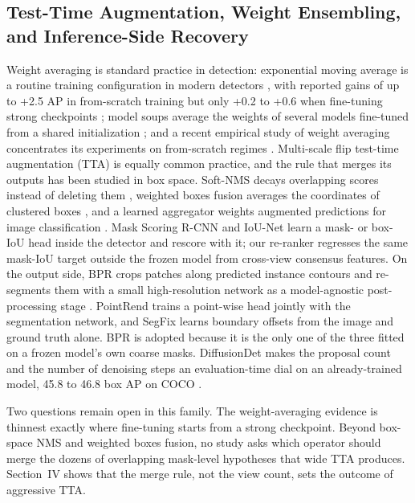 \subsection{Test-Time Augmentation, Weight Ensembling, and Inference-Side Recovery}
\label{sec:related-tta}
Weight averaging is standard practice in detection: exponential moving average is a routine training configuration in modern detectors \cite{rtdetrv22024}, with reported gains of up to +2.5 AP in from-scratch training but only +0.2 to +0.6 when fine-tuning strong checkpoints \cite{switchema2024}; model soups average the weights of several models fine-tuned from a shared initialization \cite{modelsoups2022}; and a recent empirical study of weight averaging concentrates its experiments on from-scratch regimes \cite{weightavg2025}. Multi-scale flip test-time augmentation (TTA) is equally common practice, and the rule that merges its outputs has been studied in box space. Soft-NMS decays overlapping scores instead of deleting them \cite{softnms2017}, weighted boxes fusion averages the coordinates of clustered boxes \cite{wbf2021}, and a learned aggregator weights augmented predictions for image classification \cite{shanmugam2021}. Mask Scoring R-CNN \cite{msrcnn2019} and IoU-Net \cite{iounet2018} learn a mask- or box-IoU head inside the detector and rescore with it; our re-ranker regresses the same mask-IoU target outside the frozen model from cross-view consensus features. On the output side, BPR crops patches along predicted instance contours and re-segments them with a small high-resolution network as a model-agnostic post-processing stage \cite{bpr2021}. PointRend \cite{pointrend2020} trains a point-wise head jointly with the segmentation network, and SegFix \cite{segfix2020} learns boundary offsets from the image and ground truth alone. BPR is adopted because it is the only one of the three fitted on a frozen model's own coarse masks. DiffusionDet makes the proposal count and the number of denoising steps an evaluation-time dial on an already-trained model, 45.8 to 46.8 box AP on COCO \cite{diffusiondet2023}.

Two questions remain open in this family. The weight-averaging evidence is thinnest exactly where fine-tuning starts from a strong checkpoint. Beyond box-space NMS and weighted boxes fusion, no study asks which operator should merge the dozens of overlapping mask-level hypotheses that wide TTA produces. Section~IV shows that the merge rule, not the view count, sets the outcome of aggressive TTA.

